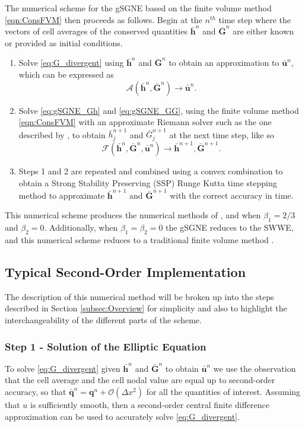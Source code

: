\documentclass[10pt]{elsarticle}
\newcommand{\vecn}[1]{\boldsymbol{#1}}
\begin{document}
The numerical scheme for the gSGNE based on the finite volume method \eqref{eqn:ConsFVM} then proceeds as follows. Begin at the $n^{th}$ time step where the vectors of cell averages of the conserved quantities $\bar{\vecn{h}}^n$ and $\bar{\vecn{G}}^n$ are either known or provided as initial conditions. 
\begin{enumerate}
	\item Solve \eqref{eq:G_divergent} using $\bar{\vecn{h}}^n$ and $\bar{\vecn{G}}^n$ to obtain an approximation to $\bar{{\vecn{u}}}^n$, which can be expressed as
	\[\mathcal{A}\left(\bar{\vecn{h}}^n,\bar{\vecn{G}}^n\right) \boldsymbol{\rightarrow} \bar{{\vecn{u}}}^n.\]
	\item Solve \eqref{eq:gSGNE_Gh} and \eqref{eq:gSGNE_GG}, using the finite volume method \eqref{eqn:ConsFVM} with an approximate Riemann solver such as the one described by \citet{Kurganov-etal-2001-707}, to obtain $\bar{h}^{n+1}_j$ and $\bar{G}^{n+1}_j$ at the next time step, like so
	\[\mathcal{F}\left(\bar{\vecn{h}}^n,\bar{\vecn{G}}^n,\bar{{\vecn{u}}}^n\right) \boldsymbol{\rightarrow}\bar{\vecn{h}}^{n+1 },\bar{\vecn{G}}^{n+1}.\]
	\item Steps 1 and 2 are repeated and combined using a convex combination to obtain a Strong Stability Preserving (SSP) Runge Kutta time stepping method \cite{Gottlieb-etal-2003-89} to approximate $\bar{\vecn{h}}^{n+1 }$ and $\bar{\vecn{G}}^{n+1}$ with the correct accuracy in time. 
\end{enumerate}

This numerical scheme produces the numerical methods of \citet{Hank-etal-2010-2034}, \citet{Zoppou-etal-2017} and \citet{Pitt-2019} when $\beta_1 = 2/3$ and $\beta_2 = 0$. Additionally, when $\beta_1 = \beta_2 = 0$ the gSGNE reduces to the SWWE, and this numerical scheme reduces to a traditional finite volume method \cite{Roberts-2003-129}.  

\subsection{Typical Second-Order Implementation}
The description of this numerical method will be broken up into the steps described in Section \ref{subsec:Overview} for simplicity and also to highlight the interchangeability of the different parts of the scheme.


\subsubsection{Step 1 - Solution of the Elliptic Equation}
To solve \eqref{eq:G_divergent} given $\bar{\vecn{h}}^n$ and $\bar{\vecn{G}}^n$ to obtain $\bar{\vecn{u}}^n$ we use the observation that the cell average and the cell nodal value are equal up to second-order accuracy, so that $\bar{\vecn{q}}^n = {\vecn{q}}^n + \mathcal{O}\left(\Delta x^2\right)$ for all the quantities of interest. Assuming that $u$ is sufficiently smooth, then a second-order central finite difference approximation can be used to accurately solve \eqref{eq:G_divergent}. 
\end{document}
